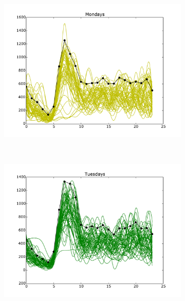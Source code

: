 \documentclass[10pt,a4paper]{amsart}
\begin{document}
\begin{figure}[h!]
    \begin{subfigure}[b]{0.5\textwidth}
        \includegraphics[width=\textwidth]
        		{Figures/Daily_trends_AC_Monday.pdf}
    \end{subfigure}
    ~
    \begin{subfigure}[b]{0.5\textwidth}
        \includegraphics[width=\textwidth]
        		{Figures/Daily_trends_AC_Tuesday.pdf}
    \end{subfigure}


\end{figure}
\end{document}
